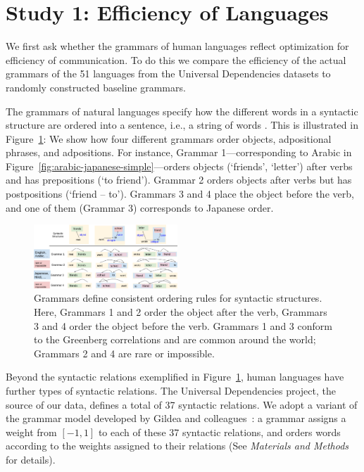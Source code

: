 \documentclass[9pt,twocolumn,twoside,lineno]{pnas-new}
\begin{document}
\section*{Study 1: Efficiency of Languages}
\label{sec:relative-efficiency}

We first ask whether the grammars of human languages reflect optimization for efficiency of communication.  To do this we
compare the efficiency of the actual grammars of the 51 languages from the Universal Dependencies datasets to randomly constructed baseline grammars.
 

The grammars of natural languages specify how the different words in a syntactic structure are ordered into a sentence, i.e., a string of words  \cite{adger2015syntax}.
This is illustrated in Figure~\ref{fig:grammars}:
We show how four different grammars order objects, adpositional phrases, and adpositions.
For instance, Grammar 1---corresponding to Arabic in Figure~\ref{fig:arabic-japanese-simple}---orders objects (`friends', `letter') after verbs and has prepositions (`to friend').
Grammar 2 orders objects after verbs but has postpositions (`friend -- to').
Grammars 3 and 4 place the object before the verb, and one of them (Grammar 3) corresponds to Japanese order.

\begin{figure}[ht]
    \centering
    \includegraphics[width=0.48\textwidth]{figure3.pdf}
	\caption{Grammars define consistent ordering rules for syntactic structures. Here, Grammars 1 and 2 order the object after the verb, Grammars 3 and 4 order the object before the verb. Grammars 1 and 3 conform to the Greenberg correlations and are common around the world; Grammars 2 and 4 are rare or impossible.} %
	\label{fig:grammars}
\end{figure}

Beyond the syntactic relations exemplified in Figure~\ref{fig:grammars}, human languages have further types of syntactic relations.
The Universal Dependencies project, the source of our data, defines a total of 37 syntactic relations.
We adopt a variant of the grammar model developed by Gildea and colleagues~\cite{gildea2007optimizing,gildea2010grammars,gildea2015human}: a grammar assigns a weight from $[-1,1]$ to each of these 37 syntactic relations, and orders words according to the weights assigned to their relations
(See \textit{Materials and Methods} for details).
\end{document}
